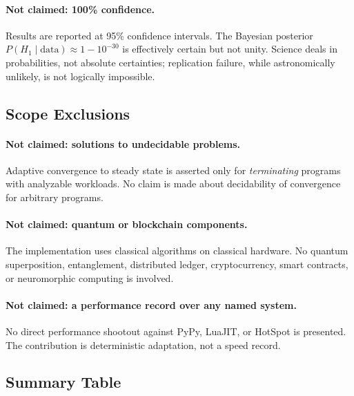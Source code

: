 \paragraph{Not claimed: 100\% confidence.}
Results are reported at 95\% confidence intervals. The Bayesian posterior
$P(H_1 \mid \text{data}) \approx 1 - 10^{-30}$ is effectively certain but
not unity. Science deals in probabilities, not absolute certainties;
replication failure, while astronomically unlikely, is not logically
impossible.

\subsection{Scope Exclusions}

\paragraph{Not claimed: solutions to undecidable problems.}
Adaptive convergence to steady state is asserted only for \emph{terminating}
programs with analyzable workloads. No claim is made about decidability of
convergence for arbitrary programs.

\paragraph{Not claimed: quantum or blockchain components.}
The implementation uses classical algorithms on classical hardware. No quantum
superposition, entanglement, distributed ledger, cryptocurrency, smart
contracts, or neuromorphic computing is involved.

\paragraph{Not claimed: a performance record over any named system.}
No direct performance shootout against PyPy, LuaJIT, or HotSpot is
presented. The contribution is deterministic adaptation, not a speed record.

\subsection{Summary Table}
\label{sec:anti-claims-summary}

